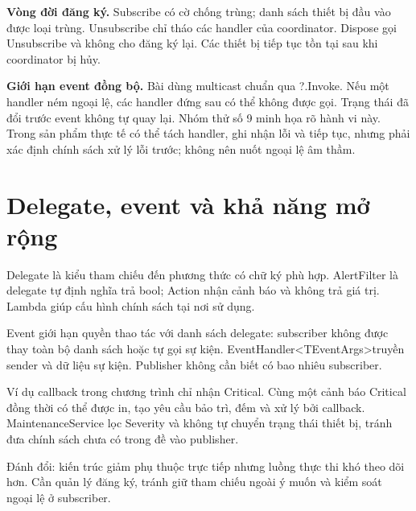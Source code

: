 \documentclass[11pt,a4paper]{article}
\begin{document}
\textbf{Vòng đời đăng ký.} Subscribe có cờ chống trùng; danh sách thiết bị đầu vào được loại trùng. Unsubscribe chỉ tháo các handler của coordinator. Dispose gọi Unsubscribe và không cho đăng ký lại. Các thiết bị tiếp tục tồn tại sau khi coordinator bị hủy.

\textbf{Giới hạn event đồng bộ.} Bài dùng multicast chuẩn qua ?.Invoke. Nếu một handler ném ngoại lệ, các handler đứng sau có thể không được gọi. Trạng thái đã đổi trước event không tự quay lại. Nhóm thử số 9 minh họa rõ hành vi này. Trong sản phẩm thực tế có thể tách handler, ghi nhận lỗi và tiếp tục, nhưng phải xác định chính sách xử lý lỗi trước; không nên nuốt ngoại lệ âm thầm.

\section{Delegate, event và khả năng mở rộng}
Delegate là kiểu tham chiếu đến phương thức có chữ ký phù hợp. AlertFilter là delegate tự định nghĩa trả bool; Action nhận cảnh báo và không trả giá trị. Lambda giúp cấu hình chính sách tại nơi sử dụng.

Event giới hạn quyền thao tác với danh sách delegate: subscriber không được thay toàn bộ danh sách hoặc tự gọi sự kiện. EventHandler\textless TEventArgs\textgreater truyền sender và dữ liệu sự kiện. Publisher không cần biết có bao nhiêu subscriber.

Ví dụ callback trong chương trình chỉ nhận Critical. Cùng một cảnh báo Critical đồng thời có thể được in, tạo yêu cầu bảo trì, đếm và xử lý bởi callback. MaintenanceService lọc Severity và không tự chuyển trạng thái thiết bị, tránh đưa chính sách chưa có trong đề vào publisher.

Đánh đổi: kiến trúc giảm phụ thuộc trực tiếp nhưng luồng thực thi khó theo dõi hơn. Cần quản lý đăng ký, tránh giữ tham chiếu ngoài ý muốn và kiểm soát ngoại lệ ở subscriber.
\newpage
\end{document}
